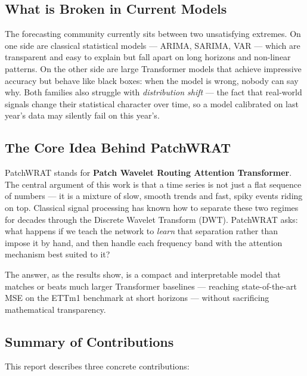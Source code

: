 \documentclass[11pt, letterpaper]{article}
\begin{document}
\subsection{What is Broken in Current Models}

The forecasting community currently sits between two unsatisfying extremes. On one side are
classical statistical models — ARIMA, SARIMA, VAR — which are transparent and easy to
explain but fall apart on long horizons and non-linear patterns. On the other side are large
Transformer models that achieve impressive accuracy but behave like black boxes: when the
model is wrong, nobody can say why. Both families also struggle with
\emph{distribution shift} — the fact that real-world signals change their statistical character
over time, so a model calibrated on last year's data may silently fail on this year's.

\subsection{The Core Idea Behind PatchWRAT}

PatchWRAT stands for \textbf{Patch Wavelet Routing Attention Transformer}. The central
argument of this work is that a time series is not just a flat sequence of numbers — it is a
mixture of slow, smooth trends and fast, spiky events riding on top. Classical signal processing
has known how to separate these two regimes for decades through the Discrete Wavelet Transform
(DWT). PatchWRAT asks: what happens if we teach the network to \emph{learn} that separation
rather than impose it by hand, and then handle each frequency band with the attention mechanism
best suited to it?

The answer, as the results show, is a compact and interpretable model that matches or beats
much larger Transformer baselines — reaching state-of-the-art MSE on the ETTm1 benchmark at
short horizons — without sacrificing mathematical transparency.

\subsection{Summary of Contributions}

This report describes three concrete contributions:
\end{document}
